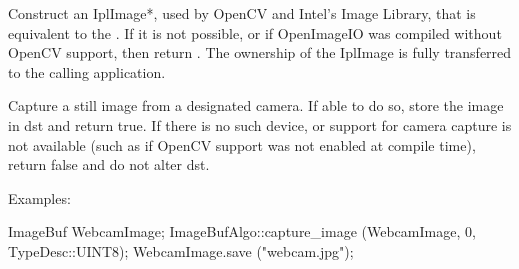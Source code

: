 \begin{comment}
\smallskip
\noindent Examples:
\begin{code}
\end{code}
\end{comment}
\apiend


 
Construct an {\cf IplImage*}, used by OpenCV and Intel's Image Library,
that is equivalent to the .  If it is not possible, or
if OpenImageIO was compiled without OpenCV support, then return
\NULL.  The ownership of the {\cf IplImage} is fully transferred to the
calling application.

\begin{comment}
\smallskip
\noindent Examples:
\begin{code}
\end{code}
\end{comment}
\apiend


 
Capture a still image from a designated camera.  If able to do so,
store the image in {\cf dst} and return {\cf true}.  If there is no such device,
or support for camera capture is not available (such as if OpenCV
support was not enabled at compile time), return {\cf false} and do not
alter {\cf dst}.

\smallskip
\noindent Examples:
\begin{code}
    ImageBuf WebcamImage;
    ImageBufAlgo::capture_image (WebcamImage, 0, TypeDesc::UINT8);
    WebcamImage.save ("webcam.jpg");
\end{code}
\apiend




\begin{comment}
\apiitem{bool {\ce blah} (ImageBuf \&dst, const ImageBuf \&src, \\
        \bigspc  ROI roi=ROI::All(), int nthreads=0)}
\index{ImageBufAlgo!blah} \indexapi{blah}
Blah.
\smallskip
\noindent Examples:
\begin{code}
\end{code}
\apiend
\end{comment}


\chapwidthend
